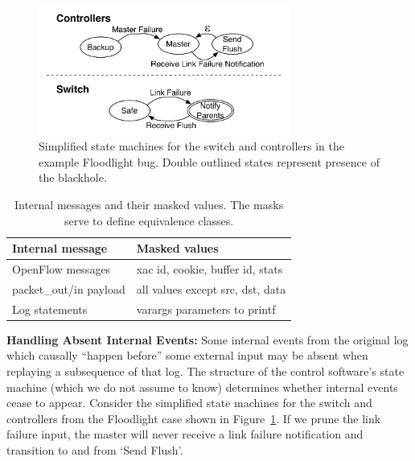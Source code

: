 \begin{figure}[t]
    \includegraphics[width=3.25in]{../diagrams/state_machines/controller_switch.pdf}
    \caption[]{\label{fig:state_machines} Simplified state machines for the switch and
    controllers in the example Floodlight bug. Double outlined states
    represent presence of the blackhole.}
\end{figure}

\begin{table}
\centering
\begin{tabular}{|l|l|}
\hline
Internal message & Masked values \\
\hline
\hline
OpenFlow messages & xac id, cookie, buffer id, stats \\
\hline
packet\_out/in payload & all values except src, dst, data \\
\hline
Log statements & varargs parameters to printf \\
\hline
\end{tabular}
\caption{Internal messages and their masked values. The masks serve to
define equivalence classes.}
\label{tab:fingerprints}
\end{table}

{\bf Handling Absent Internal Events:} Some internal events from the original
log which causally ``happen before'' some external input
may be absent when replaying a subsequence of that log.
The structure of the control software's state machine (which we do not assume to know) determines whether
internal events cease to appear. Consider the simplified state machines for the switch and
controllers from the Floodlight case shown in
Figure~\ref{fig:state_machines}. If we prune the link failure input, the
master will never receive a link failure notification and
transition to and from `Send Flush'.

